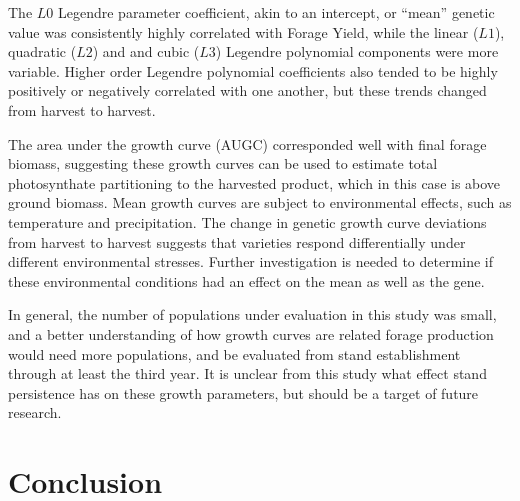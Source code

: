 \documentclass[12pt, letterpaper]{article}
\begin{document}
The $L0$ Legendre parameter coefficient, akin to an intercept, or ``mean'' genetic value  was consistently highly correlated with Forage Yield, while the linear ($L1$), quadratic ($L2$) and and cubic ($L3$) Legendre polynomial components were more variable. Higher order Legendre polynomial coefficients also tended to be highly positively or negatively correlated with one another, but these trends changed from harvest to harvest. 

The area under the growth curve (AUGC) corresponded well with final forage biomass, suggesting these growth curves can be used to estimate total photosynthate partitioning to the harvested product, which in this case is above ground biomass. Mean growth curves are subject to environmental effects, such as temperature and precipitation. The change in genetic growth curve deviations from harvest to harvest suggests that varieties respond differentially under different environmental stresses. Further investigation is needed to determine if these environmental conditions had an effect on the  mean as well as the gene.



In general, the number of populations under evaluation in this study was small, and a better understanding of how growth curves are related forage production would need more populations, and be evaluated from stand establishment through at least the third year. It is unclear from this study what effect stand persistence has on these growth parameters, but should be a target of future research. 




\section{Conclusion}

\end{document}
